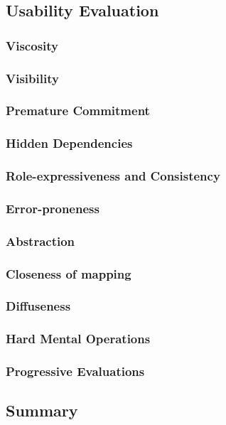 \subsection{Usability Evaluation}

\subsubsection[*]{Viscosity}

\subsubsection[*]{Visibility}

\subsubsection[*]{Premature Commitment}

\subsubsection[*]{Hidden Dependencies}

\subsubsection[*]{Role-expressiveness and Consistency}

\subsubsection[*]{Error-proneness}

\subsubsection[*]{Abstraction}

\subsubsection[*]{Closeness of mapping}

\subsubsection[*]{Diffuseness}

\subsubsection[*]{Hard Mental Operations}

\subsubsection[*]{Progressive Evaluations}

\subsection{Summary}
